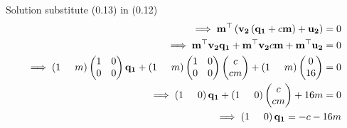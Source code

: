\documentclass{beamer}
\numberwithin{equation}{section}
\providecommand{\brak}[1]{\ensuremath{\left(#1\right)}}
\theoremstyle{remark}
\newcommand{\myvec}[1]{\ensuremath{\begin{pmatrix}#1\end{pmatrix}}}
\let\vec\mathbf
\begin{document}
\begin{frame}{Solution}
substitute (0.13) in (0.12)
\begin{align}
    \implies  \vec{m}^\top \brak{\vec{v_2}\brak{\vec{q_1}+c\vec{m}} + \vec{u_2}}=0\\
    \implies \vec{m}^\top\vec{v_2}\vec{q_1}+ \vec{m}^\top\vec{v_2}c\vec{m} + \vec{m}^\top\vec{u_2}=0\\
    \implies \brak{1 \hspace{0.5cm} m}\begin{pmatrix}
        1 & 0\\
        0 & 0
    \end{pmatrix}\vec{q_1}+ \brak{1 \hspace{0.5cm} m}\begin{pmatrix}
        1 & 0\\
        0 & 0
    \end{pmatrix} \myvec{c\\cm} + \brak{1 \hspace{0.5cm} m} \myvec{0\\16}=0\\
  \implies  \brak{1 \hspace{0.5cm} 0}\vec{q_1}+ \brak{1 \hspace{0.5cm} 0} \myvec{c\\cm} +16m =0\\
  \implies \brak{1 \hspace{0.5cm} 0}\vec{q_1} =-c-16m
\end{align}
\end{frame}
\end{document}
